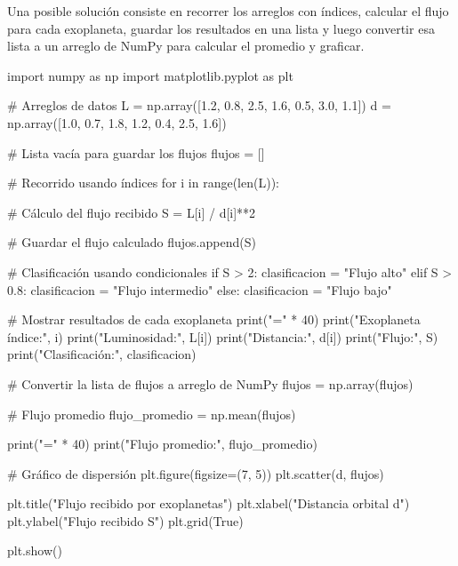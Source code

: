 \begin{solution}
Una posible solución consiste en recorrer los arreglos con índices, calcular el flujo para cada exoplaneta, guardar los resultados en una lista y luego convertir esa lista a un arreglo de NumPy para calcular el promedio y graficar.

\begin{pythonjupyter}
import numpy as np
import matplotlib.pyplot as plt

# Arreglos de datos
L = np.array([1.2, 0.8, 2.5, 1.6, 0.5, 3.0, 1.1])
d = np.array([1.0, 0.7, 1.8, 1.2, 0.4, 2.5, 1.6])

# Lista vacía para guardar los flujos
flujos = []

# Recorrido usando índices
for i in range(len(L)):

    # Cálculo del flujo recibido
    S = L[i] / d[i]**2

    # Guardar el flujo calculado
    flujos.append(S)

    # Clasificación usando condicionales
    if S > 2:
        clasificacion = "Flujo alto"
    elif S > 0.8:
        clasificacion = "Flujo intermedio"
    else:
        clasificacion = "Flujo bajo"

    # Mostrar resultados de cada exoplaneta
    print("=" * 40)
    print("Exoplaneta índice:", i)
    print("Luminosidad:", L[i])
    print("Distancia:", d[i])
    print("Flujo:", S)
    print("Clasificación:", clasificacion)

# Convertir la lista de flujos a arreglo de NumPy
flujos = np.array(flujos)

# Flujo promedio
flujo_promedio = np.mean(flujos)

print("=" * 40)
print("Flujo promedio:", flujo_promedio)

# Gráfico de dispersión
plt.figure(figsize=(7, 5))
plt.scatter(d, flujos)

plt.title("Flujo recibido por exoplanetas")
plt.xlabel("Distancia orbital d")
plt.ylabel("Flujo recibido S")
plt.grid(True)

plt.show()
\end{pythonjupyter}
\end{solution}
